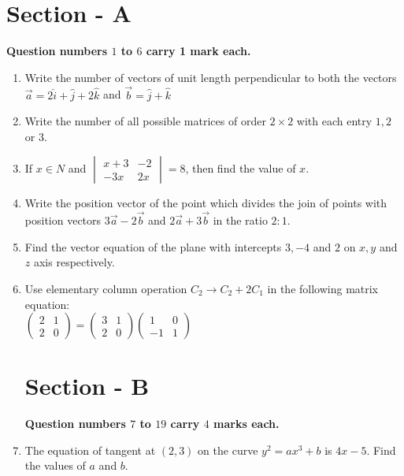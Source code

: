 \documentclass[12pt,-letter paper]{article}
\newcommand{\myvec}[1]{\ensuremath{\begin{pmatrix}#1\end{pmatrix}}}
\newcommand{\mydet}[1]{\ensuremath{\begin{vmatrix}#1\end{vmatrix}}}
\providecommand{\brak}[1]{\ensuremath{\left(#1\right)}}
\begin{document}
\section*{\textbf{Section - A}}
\textbf{Question numbers $1$ to $6$ carry 1 mark each.}\\

\begin{enumerate}

	\item Write the number of vectors of unit length perpendicular to both the vectors $\overrightarrow{a} = 2\hat{i}+\hat{j} + 2\hat{k}$ and $\overrightarrow{b} = \hat{j} + \hat{k}$\\
	
	\item Write the number of all possible matrices of order $2\times2$ with each entry $1, 2$ or $3$.\\
	
	\item If $ x \in N$ and $\mydet{x+3 & -2 \\ -3x & 2x} = 8$, then find the value of $x$.\\
	
	\item Write the position vector of the point which divides the join of points with position vectors $3\overrightarrow{a} - 2\overrightarrow{b}$ and $2\overrightarrow{a} + 3\overrightarrow{b}$ in the ratio $2:1$.\\
	
	\item Find the vector equation of the plane  with intercepts $3, -4$ and $2$ on $x, y$ and $z$ axis respectively.\\
	
	\item Use elementary column operation $ C_2 \rightarrow C_2  + 2C_1$ in the following matrix equation:\\
	$\myvec{2 & 1 \\ 2 & 0} = \myvec{3 & 1 \\ 2 & 0}\myvec{1 & 0 \\ -1 & 1}$\\
		
\section*{\textbf{Section - B}}
\textbf{Question numbers $7$ to $19$ carry $4$ marks each.}\\

	\item The equation of tangent at $\brak{2,3}$ on the curve $y^2 = ax^3 + b$ is $4x -5$. Find the values of $a$ and $b$. \\
	

\end{enumerate}
\end{document}
